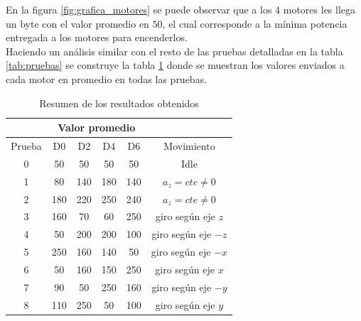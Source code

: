 \documentclass[main]{subfiles}
\begin{document}
En la figura \ref{fig:grafica_motores} se puede observar que a los 4 motores les llega un byte con el valor promedio en $50$, el cual corresponde a la mínima potencia entregada a los motores para encenderlos.\\

Haciendo un análisis similar con el resto de las pruebas detalladas en la tabla \ref{tab:pruebas} se construye la tabla \ref{tab:resumen_snif} donde se muestran los valores enviados a cada motor en promedio en todas las pruebas.\\

\begin{table}[H]
\begin{center}
\begin{tabular}{c|c|c|c|c|c|} 
\cline{2-5}
& \multicolumn{4}{c|}{\cellcolor[gray]{0.8} Valor promedio} \\ \hline
\multicolumn{1}{|c|}{\cellcolor[gray]{0.8} Prueba} & \cellcolor[gray]{0.8} D0 & \cellcolor[gray]{0.8} D2 & \cellcolor[gray]{0.8} D4 & \cellcolor[gray]{0.8} D6 & \cellcolor[gray]{0.8} Movimiento \\ \hline
\multicolumn{1}{|c|}{\cellcolor[gray]{0.8}0} & 50 & 50 & 50 & 50 & Idle \\ \hline
\multicolumn{1}{|c|}{\cellcolor[gray]{0.8}1} & 80 & 140 & 180 & 140 & $a_z=cte\neq 0$\\ \hline
\multicolumn{1}{|c|}{\cellcolor[gray]{0.8}2} & 180 & 220 & 250 & 240 & $a_z=cte\neq 0$ \\ \hline \hline
\multicolumn{1}{|c|}{\cellcolor[gray]{0.8}3} & 160 & 70 & 60 & 250 & giro según eje $z$ \\ \hline
\multicolumn{1}{|c|}{\cellcolor[gray]{0.8}4} & 50 & 200 & 200 & 100 & giro según eje $-z$\\ \hline \hline
\multicolumn{1}{|c|}{\cellcolor[gray]{0.8}5} & 250 & 160 & 140 & 50 & giro según eje $-x$\\ \hline
\multicolumn{1}{|c|}{\cellcolor[gray]{0.8}6} & 50 & 160 & 150 & 250 & giro según eje $x$ \\ \hline
\multicolumn{1}{|c|}{\cellcolor[gray]{0.8}7} & 90 & 50 & 250 & 160 & giro según eje $-y$\\ \hline
\multicolumn{1}{|c|}{\cellcolor[gray]{0.8}8} & 110 & 250 & 50 &  100 & giro según eje $y$\\ \hline
\end{tabular} 
\caption{Resumen de los resultados obtenidos}
\label{tab:resumen_snif}
\end{center}
\end{table}
\end{document}
